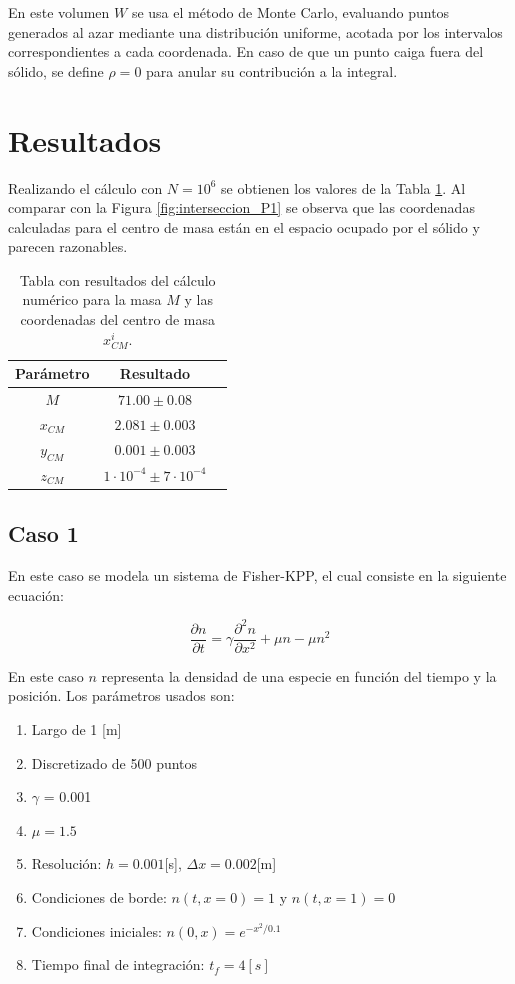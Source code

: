 \documentclass{article}
\begin{document}
En este volumen $W$ se usa el método de Monte Carlo, evaluando puntos generados al azar mediante una distribución uniforme, acotada por los intervalos correspondientes a cada coordenada. En caso de que un punto caiga fuera del sólido, se define $\rho = 0$ para anular su contribución a la integral.

\section{Resultados}

Realizando el cálculo con $N = 10^6$ se obtienen los valores de la Tabla \ref{tab:resultados}. Al comparar con la Figura \ref{fig:interseccion_P1} se observa que las coordenadas calculadas para el centro de masa están en el espacio ocupado por el sólido y parecen razonables.

\begin{table}[hl]
\centering
\begin{tabular}{|c|c|c|}
\hline
  Parámetro & Resultado \\
  \hline
  $M$ & $71.00 \pm 0.08$  \\ \hline
  $x_{CM}$ & $2.081 \pm 0.003$\\ \hline
  $y_{CM}$ & $0.001 \pm 0.003$\\ \hline
  $z_{CM}$ & $1 \cdot 10^{-4} \pm 7 \cdot 10^{-4}$\\ \hline
\end{tabular}
\caption{Tabla con resultados del cálculo numérico para la masa $M$ y las coordenadas del centro de masa $x^i_{CM}$.}
\label{tab:resultados}
\end{table}

\subsection{Caso 1}

En este caso se modela un sistema de Fisher-KPP, el cual consiste en la siguiente ecuación:

\begin{equation}
  \frac{\partial n}{\partial t} = \gamma \frac{\partial^2n}{\partial x^2} + \mu n - \mu n^2
  \label{Fisher-KPP}
\end{equation}

En este caso $n$ representa la densidad de una especie en función del tiempo y la posición. Los parámetros usados son:

\begin{enumerate}
  \item Largo de 1 [m]
  \item Discretizado de 500 puntos
  \item $\gamma$ = 0.001
  \item $\mu  = 1.5$
  \item Resolución: $h = 0.001$[s], $\Delta x = 0.002$[m]
  \item Condiciones de borde: $n(t, x=0) = 1$ y $n(t, x=1) = 0$
  \item Condiciones iniciales: $ n(0, x) = e^{-x^2/0.1} $
  \item Tiempo final de integración: $t_f = 4[s]$
\end{enumerate}
\end{document}
